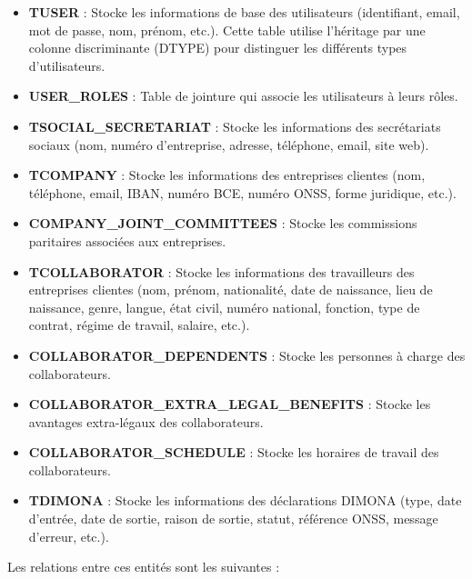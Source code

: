 \begin{itemize}
  \item \textbf{TUSER} : Stocke les informations de base des utilisateurs (identifiant, email, mot de passe, nom, prénom, etc.). Cette table utilise l'héritage par une colonne discriminante (DTYPE) pour distinguer les différents types d'utilisateurs.

  \item \textbf{USER\_ROLES} : Table de jointure qui associe les utilisateurs à leurs rôles.

  \item \textbf{TSOCIAL\_SECRETARIAT} : Stocke les informations des secrétariats sociaux (nom, numéro d'entreprise, adresse, téléphone, email, site web).

  \item \textbf{TCOMPANY} : Stocke les informations des entreprises clientes (nom, téléphone, email, IBAN, numéro BCE, numéro ONSS, forme juridique, etc.).

  \item \textbf{COMPANY\_JOINT\_COMMITTEES} : Stocke les commissions paritaires associées aux entreprises.

  \item \textbf{TCOLLABORATOR} : Stocke les informations des travailleurs des entreprises clientes (nom, prénom, nationalité, date de naissance, lieu de naissance, genre, langue, état civil, numéro national, fonction, type de contrat, régime de travail, salaire, etc.).

  \item \textbf{COLLABORATOR\_DEPENDENTS} : Stocke les personnes à charge des collaborateurs.

  \item \textbf{COLLABORATOR\_EXTRA\_LEGAL\_BENEFITS} : Stocke les avantages extra-légaux des collaborateurs.

  \item \textbf{COLLABORATOR\_SCHEDULE} : Stocke les horaires de travail des collaborateurs.

  \item \textbf{TDIMONA} : Stocke les informations des déclarations DIMONA (type, date d'entrée, date de sortie, raison de sortie, statut, référence ONSS, message d'erreur, etc.).
\end{itemize}

Les relations entre ces entités sont les suivantes :

